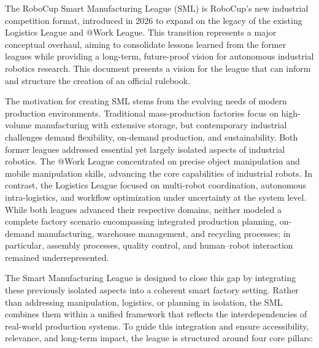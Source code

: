 \documentclass[letterpaper, 11pt]{extarticle}
\begin{document}
The RoboCup Smart Manufacturing League (SML) \cite{dissanayaka2025productionlogisticssmartmanufacturing} is RoboCup's new industrial competition format, introduced in 2026 to expand on the legacy of the existing Logistics League and @Work League.
This transition represents a major conceptual overhaul, aiming to consolidate lessons learned from the former leagues while providing a long-term, future-proof vision for autonomous industrial robotics research.
This document presents a vision for the league that can inform and structure the creation of an official rulebook.

The motivation for creating SML stems from the evolving needs of modern production environments.
Traditional mass-production factories focus on high-volume manufacturing with extensive storage, but contemporary industrial challenges demand flexibility, on-demand production, and sustainability.
Both former leagues addressed essential yet largely isolated aspects of industrial robotics. The @Work League concentrated on precise object manipulation and mobile manipulation skills, advancing the core capabilities of industrial robots.
In contrast, the Logistics League focused on multi-robot coordination, autonomous intra-logistics, and workflow optimization under uncertainty at the system level.
While both leagues advanced their respective domains, neither modeled a complete factory scenario encompassing integrated production planning, on-demand manufacturing, warehouse management, and recycling processes; in particular, assembly processes, quality control, and human–robot interaction remained underrepresented.

The Smart Manufacturing League is designed to close this gap by integrating these previously isolated aspects into a coherent smart factory setting. Rather than addressing manipulation, logistics, or planning in isolation, the SML combines them within a unified framework that reflects the interdependencies of real-world production systems.
To guide this integration and ensure accessibility, relevance, and long-term impact, the league is structured around four core pillars:
\end{document}
